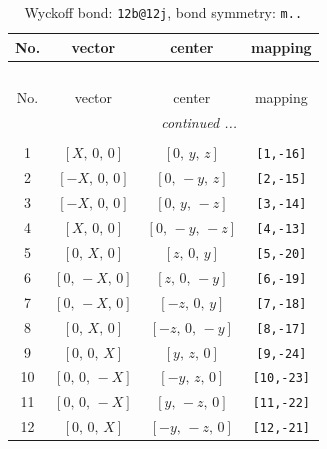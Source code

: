 \documentclass[fleqn,8pt]{jsarticle}
\begin{document}
\begin{longtable}{cccc}
\caption{Wyckoff bond: {\tt 12b@12j}, bond symmetry: {\tt m..}}
 \\
 \hline \hline
No. & vector & center & mapping \\ \hline \endfirsthead

\multicolumn{3}{l}{\tablename\ \thetable{}} \\
 \hline \hline
No. & vector & center & mapping \\ \hline \endhead

 \hline \hline
\multicolumn{3}{r}{\footnotesize\it continued ...} \\ \endfoot

 \hline \hline
\multicolumn{3}{r}{} \\ \endlastfoot

1 & $\left[ X,\, 0,\, 0 \right]$ & $\left[ 0,\, y,\, z \right]$ & {\tt [1,-16]} \\ \hline
2 & $\left[ - X,\, 0,\, 0 \right]$ & $\left[ 0,\, - y,\, z \right]$ & {\tt [2,-15]} \\ \hline
3 & $\left[ - X,\, 0,\, 0 \right]$ & $\left[ 0,\, y,\, - z \right]$ & {\tt [3,-14]} \\ \hline
4 & $\left[ X,\, 0,\, 0 \right]$ & $\left[ 0,\, - y,\, - z \right]$ & {\tt [4,-13]} \\ \hline
5 & $\left[ 0,\, X,\, 0 \right]$ & $\left[ z,\, 0,\, y \right]$ & {\tt [5,-20]} \\ \hline
6 & $\left[ 0,\, - X,\, 0 \right]$ & $\left[ z,\, 0,\, - y \right]$ & {\tt [6,-19]} \\ \hline
7 & $\left[ 0,\, - X,\, 0 \right]$ & $\left[ - z,\, 0,\, y \right]$ & {\tt [7,-18]} \\ \hline
8 & $\left[ 0,\, X,\, 0 \right]$ & $\left[ - z,\, 0,\, - y \right]$ & {\tt [8,-17]} \\ \hline
9 & $\left[ 0,\, 0,\, X \right]$ & $\left[ y,\, z,\, 0 \right]$ & {\tt [9,-24]} \\ \hline
10 & $\left[ 0,\, 0,\, - X \right]$ & $\left[ - y,\, z,\, 0 \right]$ & {\tt [10,-23]} \\ \hline
11 & $\left[ 0,\, 0,\, - X \right]$ & $\left[ y,\, - z,\, 0 \right]$ & {\tt [11,-22]} \\ \hline
12 & $\left[ 0,\, 0,\, X \right]$ & $\left[ - y,\, - z,\, 0 \right]$ & {\tt [12,-21]} \\
\end{longtable}
\renewcommand{\arraystretch}{1.2}
\end{document}
